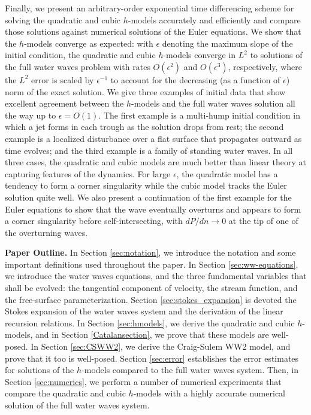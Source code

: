 \documentclass[11pt]{article}
\theoremstyle{plain}
\theoremstyle{definition}
\theoremstyle{definition}
\newcommand{\eps}{\epsilon}
\begin{document}
Finally, we present an arbitrary-order exponential time differencing
scheme
\cite{cox-matthews:etd-2002,kassam-trefethen:etd-2006,chen-wilkening:setd}
for solving the quadratic and cubic $h$-models accurately and
efficiently and compare those solutions against numerical solutions of
the Euler equations.  We show that the $h$-models converge as
expected: with $\eps$ denoting the maximum slope of the initial
condition, the quadratic and cubic $h$-models converge in $L^2$ to
solutions of the full water waves problem with rates $O(\epsilon^2)$
and $O(\epsilon^3)$, respectively, where the $L^2$ error is scaled by
$\eps^{-1}$ to account for the decreasing (as a function of $ \epsilon $) 
norm of the exact solution.
We give three examples of initial data that show excellent agreement
between the $h$-models and the full water waves solution all the way
up to $\eps=O(1)$. The first example is a multi-hump initial condition
in which a jet forms in each trough as the solution drops from rest;
the second example is a localized disturbance over a flat surface that
propagates outward as time evolves; and the third example is a family
of standing water waves. In all three cases, the quadratic and cubic
models are much better than linear theory at capturing features of the
dynamics.  For large $\epsilon$, the quadratic model has a tendency to
form a corner singularity while the cubic model tracks the Euler
solution quite well. We also present a continuation of the first
example for the Euler equations to show that the wave eventually
overturns and appears to form a corner singularity before
self-intersecting, with $dP/dn\rightarrow0$ at the tip of one of the
overturning waves.

{\bf Paper Outline.} 
In Section \ref{sec:notation}, we introduce the notation and some important definitions used throughout the paper.  In Section \ref{sec:ww-equations}, we introduce
the water waves equations, and the three fundamental variables that shall be evolved: the tangential component of velocity, the stream function, and the free-surface
parameterization.   Section \ref{sec:stokes_expansion} is devoted the Stokes expansion of the water waves system and the derivation of the linear recursion 
relations.  In Section \ref{sec:hmodels}, we derive the quadratic and cubic $h$-models, and in Section \ref{Catalansection}, we prove that these models are well-posed.    
In Section \ref{sec:CSWW2}, we derive the Craig-Sulem WW2 model, and prove that it too is well-posed. 
Section \ref{sec:error} establishes the error estimates for solutions of the $h$-models compared to the full water waves system. Then, in Section \ref{sec:numerics}, we perform a number
of numerical experiments that compare the quadratic and cubic $h$-models with a highly accurate numerical solution of the full water waves system.
\end{document}
